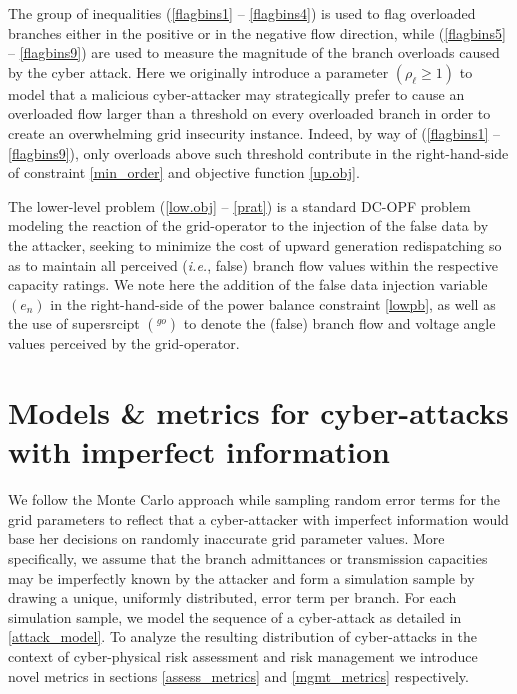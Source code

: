 \documentclass{IEEEtran4PSCC}
\begin{document}
The group of inequalities (\ref{flagbins1} -- \ref{flagbins4}) is used to flag overloaded branches either in the positive or in the negative flow direction, while  (\ref{flagbins5} -- \ref{flagbins9}) are used to measure the magnitude of the branch overloads caused by the cyber attack. Here we originally  introduce a parameter $(\rho_{\ell}\ge 1)$  to model that a malicious cyber-attacker may strategically prefer to cause an overloaded flow larger than a threshold on every overloaded branch in order to create an overwhelming grid insecurity instance. Indeed, by way of  (\ref{flagbins1} -- \ref{flagbins9}), only overloads above such threshold contribute in the right-hand-side of constraint \eqref{min_order}  and  objective function \eqref{up.obj}.

The lower-level problem (\ref{low.obj} -- \ref{prat}) is a standard DC-OPF problem modeling the reaction of the grid-operator to the injection of the false data by the attacker, seeking to minimize the cost of upward generation redispatching so as to maintain all perceived (\textit{i.e.}, false) branch flow values within the respective capacity ratings. We note here the addition of the false data injection variable $(e_n)$ in the right-hand-side of the power balance constraint \eqref{lowpb}, as well as the use of supersrcipt $(^{go})$ to denote the (false) branch flow and voltage angle values perceived by the grid-operator.
 
\color{black}

\section{Models \& metrics for cyber-attacks with imperfect information}
\label{method}
We follow the Monte Carlo approach while sampling random error terms for the grid parameters to reflect that a cyber-attacker with imperfect information would base  {her} decisions on randomly inaccurate grid parameter values. More specifically, we assume that the branch admittances or transmission capacities may be imperfectly known by the attacker and form a simulation sample by drawing a unique, uniformly distributed, error term per branch.  For each simulation sample, we model the sequence of a cyber-attack as detailed in \ref{attack_model}. To analyze the resulting distribution of cyber-attacks in the context of cyber-physical risk assessment and risk management we introduce novel metrics in sections \ref{assess_metrics} and \ref{mgmt_metrics} respectively.
\end{document}
